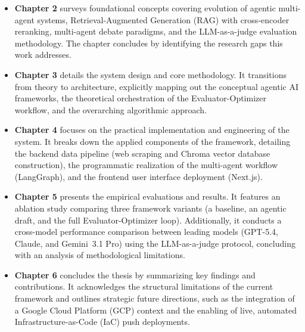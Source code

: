 \begin{itemize}
    \item \textbf{Chapter 2} surveys foundational concepts covering evolution of agentic multi-agent systems, Retrieval-Augmented Generation (RAG) with cross-encoder reranking, multi-agent debate paradigms, and the LLM-as-a-judge evaluation methodology. The chapter concludes by identifying the research gaps this work addresses.
    
    \item \textbf{Chapter 3} details the system design and core methodology. It transitions from theory to architecture, explicitly mapping out the conceptual agentic AI frameworks, the theoretical orchestration of the Evaluator-Optimizer workflow, and the overarching algorithmic approach.
    
    \item \textbf{Chapter 4} focuses on the practical implementation and engineering of the system. It breaks down the applied components of the framework, detailing the backend data pipeline (web scraping and Chroma vector database construction), the programmatic realization of the multi-agent workflow (LangGraph), and the frontend user interface deployment (Next.js).
    
    \item \textbf{Chapter 5} presents the empirical evaluations and results. It features an ablation study comparing three framework variants (a baseline, an agentic draft, and the full Evaluator-Optimizer loop). Additionally, it conducts a cross-model performance comparison between leading models (GPT-5.4, Claude, and Gemini~3.1 Pro) using the LLM-as-a-judge protocol, concluding with an analysis of methodological limitations.
    
    \item \textbf{Chapter 6} concludes the thesis by summarizing key findings and contributions. It acknowledges the structural limitations of the current framework and outlines strategic future directions, such as the integration of a Google Cloud Platform (GCP) context and the enabling of live, automated Infrastructure-as-Code (IaC) push deployments.
\end{itemize}